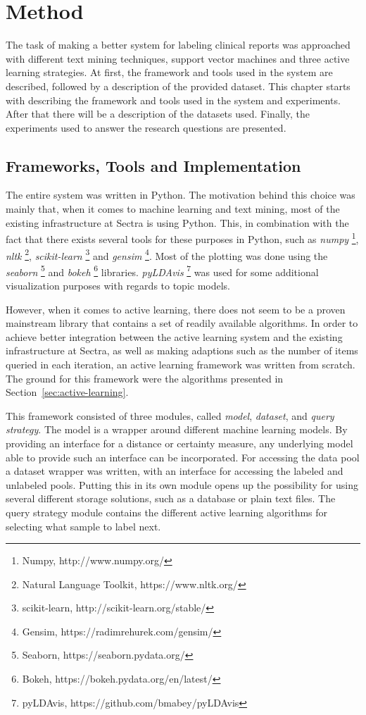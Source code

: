 \chapter{Method}
\label{cha:method}

The task of making a better system for labeling clinical reports was approached with different text mining techniques, support vector machines and three active learning strategies.
At first, the framework and tools used in the system are described, followed by a description of the provided dataset.
This chapter starts with describing the framework and tools used in the system and experiments.
After that there will be a description of the datasets used.
Finally, the experiments used to answer the research questions are presented.

\section{Frameworks, Tools and Implementation}
The entire system was written in Python.
The motivation behind this choice was mainly that, when it comes to machine learning and text mining, most of the existing infrastructure at Sectra is using Python.
This, in combination with the fact that there exists several tools for these purposes in Python, such as \textit{numpy} \footnote{Numpy, http://www.numpy.org/}, \textit{nltk} \footnote{Natural Language Toolkit, https://www.nltk.org/}, \textit{scikit-learn} \footnote{scikit-learn, http://scikit-learn.org/stable/} and \textit{gensim} \footnote{Gensim, https://radimrehurek.com/gensim/}.
Most of the plotting was done using the \textit{seaborn} \footnote{Seaborn, https://seaborn.pydata.org/} and \textit{bokeh} \footnote{Bokeh, https://bokeh.pydata.org/en/latest/} libraries.
\textit{pyLDAvis} \footnote{pyLDAvis, https://github.com/bmabey/pyLDAvis} was used for some additional visualization purposes with regards to topic models.

However, when it comes to active learning, there does not seem to be a proven mainstream library that contains a set of readily available algorithms.
In order to achieve better integration between the active learning system and the existing infrastructure at Sectra, as well as making adaptions such as the number of items queried in each iteration, an active learning framework was written from scratch.
The ground for this framework were the algorithms presented in Section~\ref{sec:active-learning}.

This framework consisted of three modules, called \textit{model}, \textit{dataset}, and \textit{query strategy}.
The model is a wrapper around different machine learning models.
By providing an interface for a distance or certainty measure, any underlying model able to provide such an interface can be incorporated.
For accessing the data pool a dataset wrapper was written, with an interface for accessing the labeled and unlabeled pools.
Putting this in its own module opens up the possibility for using several different storage solutions, such as a database or plain text files.
The query strategy module contains the different active learning algorithms for selecting what sample to label next.

